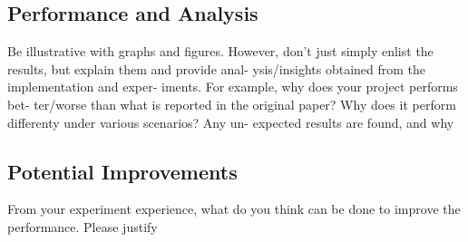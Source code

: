 \documentclass{acm_proc_article-sp}
\begin{document}
\subsection{Performance and Analysis}
Be illustrative with graphs and figures.  However, don’t just
simply enlist the results, but explain them and provide anal-
ysis/insights obtained from the implementation and exper-
iments.  For example, why does your project performs bet-
ter/worse than what is reported in the original paper?  Why
does it perform differenty under various scenarios?  Any un-
expected results are found, and why

\subsection{Potential Improvements}
From  your  experiment  experience,  what  do  you  think  can
be done to improve the performance.  Please justify

%

%
%
\end{document}

